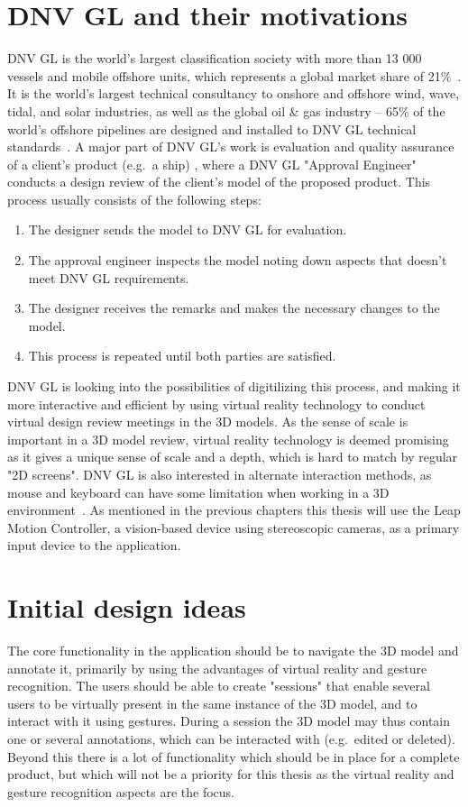 \section{DNV GL and their motivations}
DNV GL is the world's largest classification society with more than 13 000 vessels and mobile offshore units, which represents a global market share of 21\%~\citep{TO:DNVGL}. 
It is the world's largest technical consultancy to onshore and offshore wind, wave, tidal, and solar industries, as well as the global oil \& gas industry 
-- 65\% of the world’s offshore pipelines are designed and installed to DNV GL technical standards~\citep{MTN:DNVGL}. 
A major part of DNV GL's work is evaluation and quality assurance of a client's product (e.g.~a ship) , 
where a DNV GL "Approval Engineer" conducts a design review of the client's model of the proposed product. 
This process usually consists of the following steps: 

\begin{enumerate}
	\item The designer sends the model to DNV GL for evaluation.
	\item The approval engineer inspects the model noting down aspects that doesn't meet DNV GL requirements.
	\item The designer receives the remarks and makes the necessary changes to the model.
	\item This process is repeated until both parties are satisfied.
\end{enumerate}

DNV GL is looking into the possibilities of digitilizing this process, and making it more interactive and efficient by using
virtual reality technology to conduct virtual design review meetings in the 3D models. 
As the sense of scale is important in a 3D model review, virtual reality technology is deemed promising as it gives a unique sense of scale
and a depth, which is hard to match by regular "2D screens". DNV GL is also interested in alternate interaction methods, as mouse and keyboard 
can have some limitation when working in a 3D environment~\citep{Rautaray2015}. As mentioned in the previous chapters this thesis will use 
the Leap Motion Controller, a vision-based device using stereoscopic cameras, as a primary input device to the application. 

\section{Initial design ideas} 
The core functionality in the application should be to navigate the 3D model and annotate it, primarily by using the advantages of virtual reality and 
gesture recognition. The users should be able to create "sessions" that enable several users to be virtually present 
in the same instance of the 3D model, and to interact with it using gestures. During a session the 3D model may thus contain one or several annotations,
which can be interacted with (e.g.~edited or deleted). Beyond this there is a lot of functionality which should be in place for a complete product, but which will not be a priority 
for this thesis as the virtual reality and gesture recognition aspects are the focus. 

